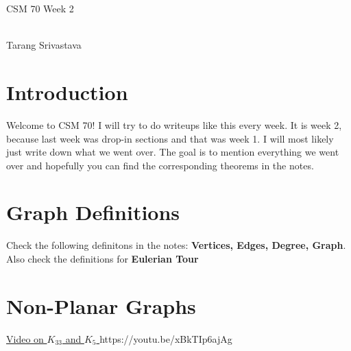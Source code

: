 \documentclass[10pt, twocolumn]{article}
\author{Tarang Srivastava}
\newcommand{\makechaptertitle}[1]{
\begin{center}
	\begin{large}
		#1
	\end{large}
	\begin{small}
		\\Tarang Srivastava
	\end{small}
\end{center}
}
\theoremstyle{definition}
\theoremstyle{definition}
\begin{document}
\makechaptertitle{CSM 70 Week 2}

\section{Introduction}
    Welcome to CSM 70! I will try to do writeups like this every week. 
    It is week 2, because last week was drop-in sections and that was week 1.
    I will most likely just write down what we went over. 
    The goal is to mention everything we went over and hopefully you can find the corresponding theorems in the notes. 
\section{Graph Definitions}
Check the following definitons in the notes: \textbf{Vertices, Edges, Degree, Graph}. 
Also check the definitions for \textbf{Eulerian Tour}
\section{Non-Planar Graphs}
\href{https://youtu.be/xBkTIp6ajAg}{Video on $K_{33}$ and $ K_{5}$ }
https://youtu.be/xBkTIp6ajAg
\end{document}
